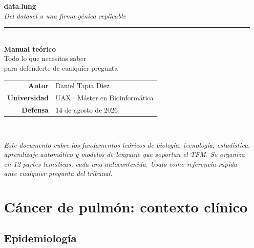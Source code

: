 \documentclass[11pt, a4paper]{article}
\begin{document}
\thispagestyle{empty}
\vspace*{1.5cm}
\begin{center}
  {\ttfamily\fontsize{44pt}{44pt}\selectfont\bfseries
   data\textcolor{verdeTerm}{.}lung}\\[0.2cm]
  {\itshape\normalsize\color{tinta2}Del dataset a una firma g\'enica replicable}\\[0.8cm]

  \textcolor{verdeTerm}{\rule{3cm}{2pt}}\\[0.6cm]

  {\LARGE\bfseries Manual te\'orico}\\[0.3cm]
  {\large\color{tinta2}Todo lo que necesitas saber\\para defenderte de cualquier pregunta}\\[1.5cm]

  \begin{tabular}{rl}
    \color{mute}\textbf{Autor}      & Daniel Tapia D\'iez \\
    \color{mute}\textbf{Universidad}& UAX $\cdot$ M\'aster en Bioinform\'atica \\
    \color{mute}\textbf{Defensa}    & 14 de agosto de 2026 \\
  \end{tabular}\\[2cm]

  \begin{tcolorbox}[colback=plano, colframe=verdeTerm, width=0.85\textwidth,
                    arc=3pt, boxrule=1pt]
    \small\itshape
    Este documento cubre los fundamentos te\'oricos de biolog\'ia,
    tecnolog\'ia, estad\'istica, aprendizaje autom\'atico y modelos de
    lenguaje que soportan el TFM. Se organiza en 12 partes tem\'aticas,
    cada una autocontenida. \'Usalo como referencia r\'apida ante
    cualquier pregunta del tribunal.
  \end{tcolorbox}
\end{center}
\newpage

\tableofcontents
\newpage

\section{C\'ancer de pulm\'on: contexto cl\'inico}

\subsection{Epidemiolog\'ia}
\end{document}
